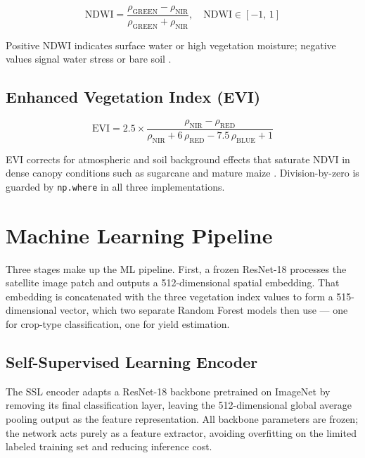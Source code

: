 \documentclass[12pt,a4paper,oneside]{report}
\begin{document}
\begin{equation}
\mathrm{NDWI} = \frac{\rho_\mathrm{GREEN} - \rho_\mathrm{NIR}}
                     {\rho_\mathrm{GREEN} + \rho_\mathrm{NIR}}, \quad
\mathrm{NDWI} \in [-1,\,1]
\label{eq:ndwi}
\end{equation}

Positive NDWI indicates surface water or high vegetation moisture; negative values
signal water stress or bare soil \cite{mcfeeters1996ndwi}.

\subsection{Enhanced Vegetation Index (EVI)}

\begin{equation}
\mathrm{EVI} = 2.5 \times
\frac{\rho_\mathrm{NIR} - \rho_\mathrm{RED}}
     {\rho_\mathrm{NIR} + 6\,\rho_\mathrm{RED} - 7.5\,\rho_\mathrm{BLUE} + 1}
\label{eq:evi}
\end{equation}

EVI corrects for atmospheric and soil background effects that saturate NDVI in
dense canopy conditions such as sugarcane and mature maize \cite{huete2002evi}.
Division-by-zero is guarded by \texttt{np.where} in all three implementations.

\section{Machine Learning Pipeline}

Three stages make up the ML pipeline. First, a frozen ResNet-18 processes the satellite image patch and outputs a 512-dimensional spatial embedding. That embedding is concatenated with the three vegetation index values to form a 515-dimensional vector, which two separate Random Forest models then use — one for crop-type classification, one for yield estimation.

\subsection{Self-Supervised Learning Encoder}

The SSL encoder adapts a ResNet-18 backbone \cite{he2016resnet} pretrained on
ImageNet by removing its final classification layer, leaving the 512-dimensional
global average pooling output as the feature representation. All backbone parameters
are frozen; the network acts purely as a feature extractor, avoiding overfitting on
the limited labeled training set and reducing inference cost.
\end{document}
